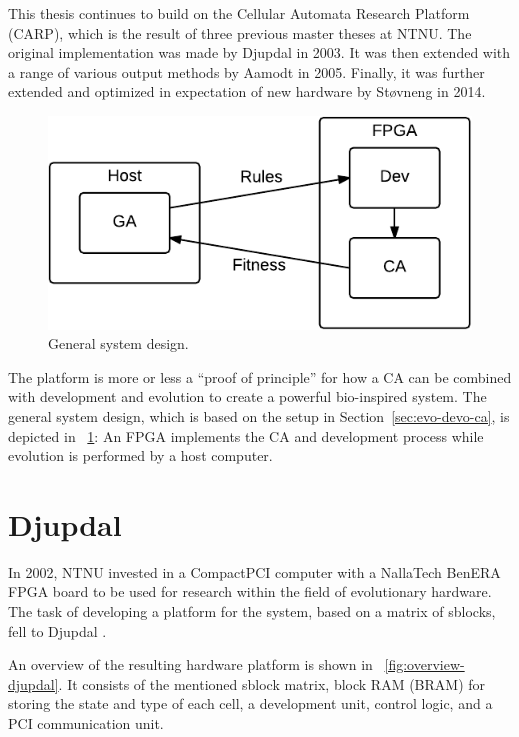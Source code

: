 This thesis continues to build on the Cellular Automata Research Platform (CARP), which is the result of three previous master theses at NTNU.
The original implementation was made by Djupdal in 2003.
It was then extended with a range of various output methods by Aamodt in 2005.
Finally, it was further extended and optimized in expectation of new hardware by Støvneng in 2014.

\begin{figure}[!ht]
    \centering
    \includegraphics[width=28\block]{figures/overview-general}
    \caption[System design]{
        General system design.
    }
    \label{fig:overview-general}
\end{figure}

The platform is more or less a ``proof of principle'' for how a CA can be combined with development and evolution to create a powerful bio-inspired system.
The general system design, which is based on the setup in Section~\ref{sec:evo-devo-ca}, is depicted in \figurename~\ref{fig:overview-general}:
An FPGA implements the CA and development process while evolution is performed by a host computer.


\section{Djupdal}

In 2002, NTNU invested in a CompactPCI computer with a NallaTech BenERA FPGA board to be used for research within the field of evolutionary hardware.
The task of developing a platform for the system, based on a matrix of sblocks, fell to Djupdal \cite{djupdal2003sblock}.

An overview of the resulting hardware platform is shown in \figurename~\ref{fig:overview-djupdal}.
It consists of the mentioned sblock matrix, block RAM (BRAM) for storing the state and type of each cell, a development unit, control logic, and a PCI communication unit.

